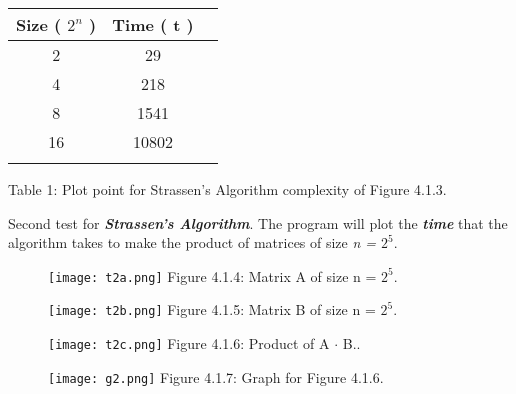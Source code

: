 \begin{center}
{\Large
\begin{tabular}[.5cm]{ c c c }
\toprule
Size ( $2^{n}$ ) & Time ( t ) \\
\midrule
2 & 29 \\
\cmidrule {1-2}
4 & 218 \\
\cmidrule {1-2}
8 & 1541 \\
\cmidrule {1-2}
16 & 10802 \\
\bottomrule
\linebreak
\end{tabular}}
\linebreak \linebreak Table 1: Plot point for Strassen's Algorithm complexity of Figure 4.1.3.
\end{center}

\pagebreak

Second test for {\bfseries\itshape Strassen's Algorithm}. The program will plot the {\bfseries\itshape time} that the algorithm takes to make the product of matrices of size {\itshape  n = $2^{5}$}. \hfill \break

\begin{multicols}{2}
\begin{figure}[H]
\texttt{[image: t2a.png]}
\centering \linebreak \linebreak Figure 4.1.4: Matrix A of size n = $2^{5}$.
\end{figure} \hfill 

\begin{figure}[H]
\texttt{[image: t2b.png]}
\centering \linebreak \linebreak Figure 4.1.5: Matrix B of size n = $2^{5}$.
\end{figure} 
\end{multicols}

\begin{figure}[H]
\texttt{[image: t2c.png]}
\centering \linebreak \linebreak Figure 4.1.6: Product of A $\cdot$ B..
\end{figure} 

\pagebreak

\begin{figure}[H]
\texttt{[image: g2.png]}
\centering \linebreak \linebreak Figure 4.1.7: Graph for Figure 4.1.6.
\end{figure} \hfill

